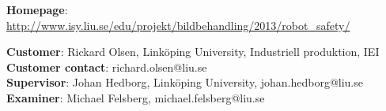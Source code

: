 \begin{titlepage}
\begin{center}
{\footnotesize
\vspace{0.5\baselineskip}
\textbf{Homepage}: \href{http://www.isy.liu.se/edu/projekt/bildbehandling/2013/robot\_safety/}{http://www.isy.liu.se/edu/projekt/bildbehandling/2013/robot\_safety/} \\
\vspace{1\baselineskip}

\textbf{Customer}: Rickard Olsen, Link\"{o}ping University, Industriell produktion, IEI \\
\textbf{Customer contact}: richard.olsen@liu.se \\
\textbf{Supervisor}: Johan Hedborg, Link\"{o}ping University, johan.hedborg@liu.se \\
\textbf{Examiner}: Michael Felsberg, michael.felsberg@liu.se \\
}

\end{center}
\end{titlepage}
